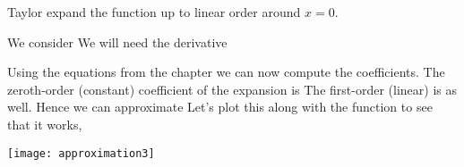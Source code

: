 
\label{exGeneratingSimple}Taylor expand the function 
up to linear order around $x=0$.

\solution
We consider 
We will need the derivative 

Using the equations from the chapter we can now compute the coefficients. The zeroth-order (constant) coefficient of the expansion is 
The first-order (linear) is 
as well. Hence we can approximate 
Let's plot this along with the function to see that it works,
\begin{center}
    \texttt{[image: approximation3]}
\end{center}
